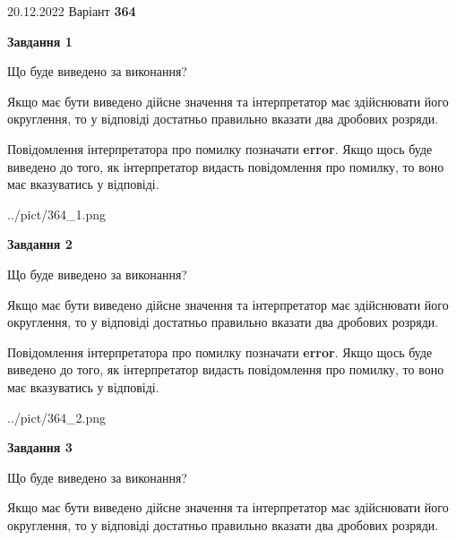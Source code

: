 \documentclass[12pt, ukrainian]{article}
\begin{document}
{20.12.2022 Варіант \No \textbf { 364 }\par}
{
\begin {Large}

{\begin {center}\textbf{Завдання 1}\end {center}}\par
Що буде виведено за виконання? \par

Якщо має бути виведено дійсне значення та інтерпретатор має здійснювати його округлення, 
то у відповіді достатньо правильно вказати два дробових розряди.

Повідомлення інтерпретатора про помилку позначати \textbf{error}.
Якщо щось буде виведено до того, як інтерпретатор видасть повідомлення про помилку, 
то воно має вказуватись у відповіді. \par

\begin{center}
	{../pict/364_1.png}
\end{center}
\newpage

{\begin {center}\textbf{Завдання 2}\end {center}}\par
Що буде виведено за виконання? \par

Якщо має бути виведено дійсне значення та інтерпретатор має здійснювати його округлення, 
то у відповіді достатньо правильно вказати два дробових розряди.

Повідомлення інтерпретатора про помилку позначати \textbf{error}.
Якщо щось буде виведено до того, як інтерпретатор видасть повідомлення про помилку, 
то воно має вказуватись у відповіді. \par

\begin{center}
	{../pict/364_2.png}
\end{center}
\newpage

{\begin {center}\textbf{Завдання 3}\end {center}}\par
Що буде виведено за виконання? \par

Якщо має бути виведено дійсне значення та інтерпретатор має здійснювати його округлення, 
то у відповіді достатньо правильно вказати два дробових розряди.


\end{Large}}
\end{document}
